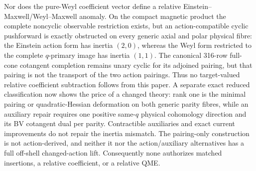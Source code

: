 \documentclass[11pt]{article}
\theoremstyle{definition}
\theoremstyle{remark}
\begin{document}
Nor does the pure-Weyl coefficient vector define a relative
Einstein--Maxwell/Weyl--Maxwell anomaly.  On the compact magnetic product the
complete noncyclic observable restriction exists, but an action-compatible
cyclic pushforward is exactly obstructed on every generic axial and polar
physical fibre: the Einstein action form has inertia $(2,0)$, whereas the
Weyl form restricted to the complete $q$-primary image has inertia $(1,1)$.
The canonical 316-row full-cone cotangent completion remains unary cyclic for
its adjoined pairing, but that pairing is not the transport of the two action
pairings.  Thus no target-valued relative coefficient subtraction follows
from this paper.  A separate exact reduced classification now shows the price
of a changed theory: rank one is the minimal pairing or quadratic-Hessian
deformation on both generic parity fibres, while an auxiliary repair requires
one positive same-$q$ physical cohomology direction and its BV cotangent dual
per parity.  Contractible auxiliaries and exact current improvements do not
repair the inertia mismatch.  The pairing-only construction is not
action-derived, and neither it nor the action/auxiliary alternatives has a
full off-shell changed-action lift.  Consequently none authorizes matched
insertions, a relative coefficient, or a relative QME.
\end{document}
